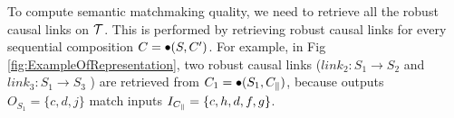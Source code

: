 

To compute semantic matchmaking quality, we need to retrieve all the robust causal links on $\mathcal{T}$. This is performed by retrieving robust  causal links for every  sequential composition $C=\bullet(S,C^\prime)$. For example,  in Fig \ref{fig:ExampleOfRepresentation}, two robust causal links ($link_2: S_1 \rightarrow S_2$ and $link_3: S_1 \rightarrow S_3$ ) are retrieved from $C_1 = \bullet (S_1, C_{\parallel})$, because outputs $O_{S_1}=\{ c, d, j \}$ match inputs $I_{C_{\parallel}}=\{c, h, d, f, g\}$.



